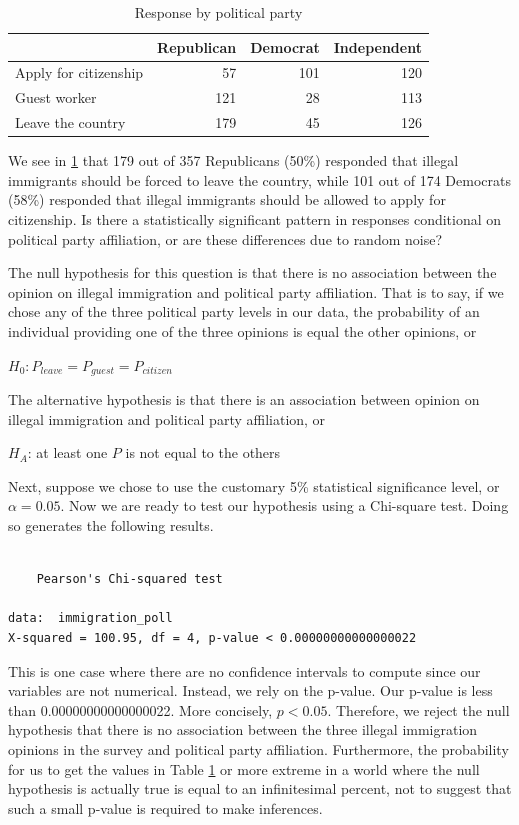 \documentclass[
]{book}
\begin{document}
\begin{table}

\caption{\label{tab:pollparty}Response by political party}
\centering
\begin{tabular}[t]{l|r|r|r}
\hline
  & Republican & Democrat & Independent\\
\hline
Apply for citizenship & 57 & 101 & 120\\
\hline
Guest worker & 121 & 28 & 113\\
\hline
Leave the country & 179 & 45 & 126\\
\hline
\end{tabular}
\end{table}

We see in \ref{tab:pollparty} that 179 out of 357 Republicans (50\%) responded that illegal immigrants should be forced to leave the country, while 101 out of 174 Democrats (58\%) responded that illegal immigrants should be allowed to apply for citizenship. Is there a statistically significant pattern in responses conditional on political party affiliation, or are these differences due to random noise?

The null hypothesis for this question is that there is no association between the opinion on illegal immigration and political party affiliation. That is to say, if we chose any of the three political party levels in our data, the probability of an individual providing one of the three opinions is equal the other opinions, or

\(H_0: P_{leave} = P_{guest} = P_{citizen}\)

The alternative hypothesis is that there is an association between opinion on illegal immigration and political party affiliation, or

\(H_A\): at least one \(P\) is not equal to the others

Next, suppose we chose to use the customary 5\% statistical significance level, or \(\alpha=0.05\). Now we are ready to test our hypothesis using a Chi-square test. Doing so generates the following results.

\begin{verbatim}

    Pearson's Chi-squared test

data:  immigration_poll
X-squared = 100.95, df = 4, p-value < 0.00000000000000022
\end{verbatim}

This is one case where there are no confidence intervals to compute since our variables are not numerical. Instead, we rely on the p-value. Our p-value is less than 0.00000000000000022. More concisely, \(p<0.05\). Therefore, we reject the null hypothesis that there is no association between the three illegal immigration opinions in the survey and political party affiliation. Furthermore, the probability for us to get the values in Table \ref{tab:pollparty} or more extreme in a world where the null hypothesis is actually true is equal to an infinitesimal percent, not to suggest that such a small p-value is required to make inferences.
\end{document}
